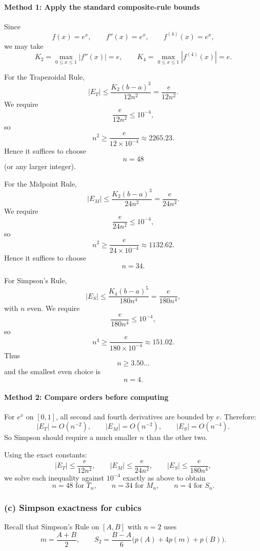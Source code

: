 \documentclass[12pt]{article}
\begin{document}
\paragraph{Method 1: Apply the standard composite-rule bounds}
Since
\[
f(x)=e^x,
\qquad
f''(x)=e^x,
\qquad
f^{(4)}(x)=e^x,
\]
we may take
\[
K_2=\max_{0\le x\le 1}|f''(x)|=e,
\qquad
K_4=\max_{0\le x\le 1}|f^{(4)}(x)|=e.
\]

For the Trapezoidal Rule,
\[
|E_T|\le \frac{K_2(b-a)^3}{12n^2}
=
\frac{e}{12n^2}.
\]
We require
\[
\frac{e}{12n^2}\le 10^{-4},
\]
so
\[
n^2\ge \frac{e}{12\times 10^{-4}}\approx 2265.23.
\]
Hence it suffices to choose
\[
\boxed{n=48}
\]
(or any larger integer).

For the Midpoint Rule,
\[
|E_M|\le \frac{K_2(b-a)^3}{24n^2}
=
\frac{e}{24n^2}.
\]
We require
\[
\frac{e}{24n^2}\le 10^{-4},
\]
so
\[
n^2\ge \frac{e}{24\times 10^{-4}}\approx 1132.62.
\]
Hence it suffices to choose
\[
\boxed{n=34}.
\]

For Simpson's Rule,
\[
|E_S|\le \frac{K_4(b-a)^5}{180n^4}
=
\frac{e}{180n^4},
\]
with \(n\) even. We require
\[
\frac{e}{180n^4}\le 10^{-4},
\]
so
\[
n^4\ge \frac{e}{180\times 10^{-4}}\approx 151.02.
\]
Thus
\[
n\ge 3.50\ldots
\]
and the smallest even choice is
\[
\boxed{n=4}.
\]

\paragraph{Method 2: Compare orders before computing}
For \(e^x\) on \([0,1]\), all second and fourth derivatives are bounded by \(e\). Therefore:
\[
|E_T|=O(n^{-2}),\qquad |E_M|=O(n^{-2}),\qquad |E_S|=O(n^{-4}).
\]
So Simpson should require a much smaller \(n\) than the other two.

Using the exact constants:
\[
|E_T|\le \frac{e}{12n^2},\qquad
|E_M|\le \frac{e}{24n^2},\qquad
|E_S|\le \frac{e}{180n^4},
\]
we solve each inequality against \(10^{-4}\) exactly as above to obtain
\[
\boxed{n=48 \text{ for } T_n,\qquad n=34 \text{ for } M_n,\qquad n=4 \text{ for } S_n.}
\]

\bigskip

\subsubsection{(c) Simpson exactness for cubics}

Recall that Simpson's Rule on \([A,B]\) with \(n=2\) uses
\[
m=\frac{A+B}{2},
\qquad
S_2=\frac{B-A}{6}\bigl(p(A)+4p(m)+p(B)\bigr).
\]
\end{document}
